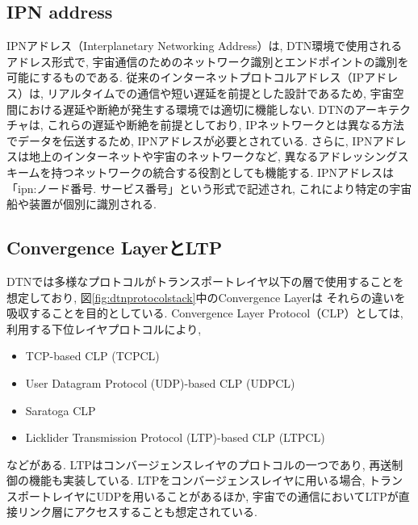 \subsection{IPN address}
\label{subsection:IPN address}
IPNアドレス（Interplanetary Networking Address）は, DTN環境で使用されるアドレス形式で, 
宇宙通信のためのネットワーク識別とエンドポイントの識別を可能にするものである. 従来のインターネットプロトコルアドレス（IPアドレス）は, 
リアルタイムでの通信や短い遅延を前提とした設計であるため, 宇宙空間における遅延や断絶が発生する環境では適切に機能しない. 
DTNのアーキテクチャは, これらの遅延や断絶を前提としており, IPネットワークとは異なる方法でデータを伝送するため, 
IPNアドレスが必要とされている.  さらに,  IPNアドレスは地上のインターネットや宇宙のネットワークなど, 
異なるアドレッシングスキームを持つネットワークの統合する役割としても機能する. 
IPNアドレスは「ipn:ノード番号. サービス番号」という形式で記述され, これにより特定の宇宙船や装置が個別に識別される.  

\subsection{Convergence LayerとLTP}
\label{section:Convergence LayerとLTP}
DTNでは多様なプロトコルがトランスポートレイヤ以下の層で使用することを想定しており,  
図\ref{fig:dtnprotocolstack}中のConvergence Layerは
それらの違いを吸収することを目的としている.  Convergence Layer Protocol（CLP）としては,  
利用する下位レイヤプロトコルにより, 

\begin{itemize}
    \item TCP-based CLP (TCPCL)
    \item User Datagram Protocol (UDP)-based CLP (UDPCL)
    \item Saratoga CLP
    \item Licklider Transmission Protocol (LTP)-based CLP (LTPCL)
\end{itemize}

などがある. 
LTP\cite{rfc5326}はコンバージェンスレイヤのプロトコルの一つであり,  再送制御の機能も実装している. 
LTPをコンバージェンスレイヤに用いる場合,  トランスポートレイヤにUDPを用いることがあるほか,  
宇宙での通信においてLTPが直接リンク層にアクセスすることも想定されている. 

